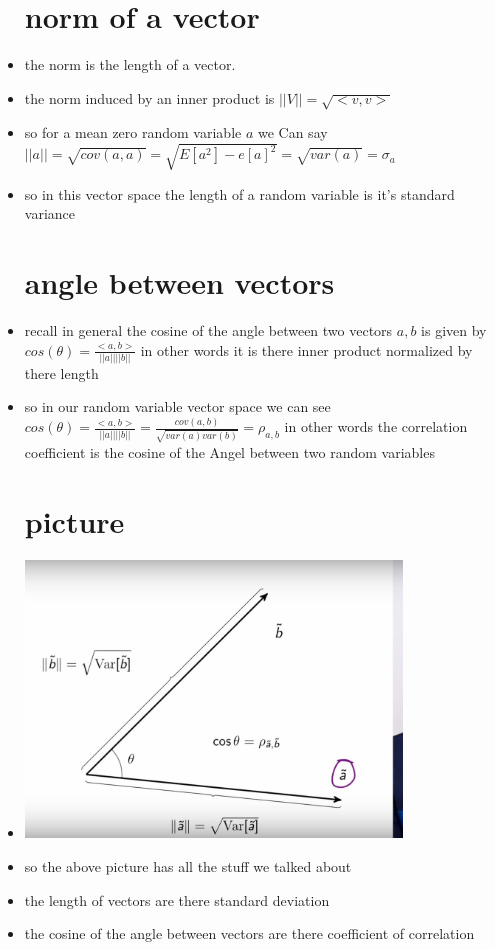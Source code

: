 \documentclass{article}
\begin{document}
\begin{itemize}
\section{norm of a vector}
\item the norm is the length of a vector. 
\item the norm induced by an inner product is $||V||=\sqrt{<v,v>}$
\item so for a mean zero random variable $a$ we Can say $||a||=\sqrt{cov(a,a)}=\sqrt{E[a^2]-e[a]^2}=\sqrt{var(a)}=\sigma_{a}$ 
\item so in this vector space the length of a random variable is it's standard variance
\section{angle between vectors}
\item recall in general the cosine of the angle between two vectors $a,b$ is given by $cos(\theta)=\frac{<a,b>}{||a||||b||}$ in other words it is there inner product normalized by there length
\item so in our random variable vector space we can see $cos(\theta)=\frac{<a,b>}{||a||||b||}=\frac{cov(a,b)}{\sqrt{var(a)var(b)}}=\rho_{a,b}$ in other words the correlation coefficient is the cosine of the Angel between two random variables 
\section{picture}
\item \includegraphics[width=10cm]{notes/week_2/geometric_1.jpg}
\item so the above picture has all the stuff we talked about
\item the length of vectors are there standard deviation 
\item the cosine of the angle between vectors are there coefficient of correlation 


\end{itemize}
\end{document}
